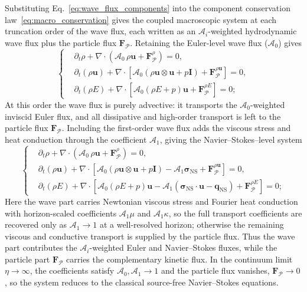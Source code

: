 \documentclass[preprint,12pt]{elsarticle}
\begin{document}
Substituting Eq.~\eqref{eq:wave_flux_components} into the component conservation law~\eqref{eq:macro_conservation} gives the coupled macroscopic system at each truncation order of the wave flux, each written as an $\mathcal A_i$-weighted hydrodynamic wave flux plus the particle flux $\mathbf F_{\mathcal{P}}$. Retaining the Euler-level wave flux ($\mathcal A_0$) gives
\begin{equation}\label{eq:euler_system}
\left\{
\begin{aligned}
&\partial_t\rho
    +\nabla\cdot\left(\mathcal A_0\,\rho\boldsymbol{u}+\mathbf F_{\mathcal{P}}^{\rho}\right)=0,\\
&\partial_t(\rho\boldsymbol{u})
    +\nabla\cdot\left[\mathcal A_0\left(\rho\boldsymbol{u}\otimes\boldsymbol{u}+p\mathbf I\right)
    +\mathbf F_{\mathcal{P}}^{\rho\boldsymbol{u}}\right]=0,\\
&\partial_t(\rho E)
    +\nabla\cdot\left[\mathcal A_0\left(\rho E+p\right)\boldsymbol{u}
    +\mathbf F_{\mathcal{P}}^{\rho E}\right]=0;
\end{aligned}
\right.
\end{equation}
At this order the wave flux is purely advective: it transports the $\mathcal A_0$-weighted inviscid Euler flux, and all dissipative and high-order transport is left to the particle flux $\mathbf F_{\mathcal{P}}$. Including the first-order wave flux adds the viscous stress and heat conduction through the coefficient $\mathcal A_1$, giving the Navier--Stokes--level system
\begin{equation}\label{eq:ns_system}
\left\{
\begin{aligned}
&\partial_t\rho
    +\nabla\cdot\left(\mathcal A_0\,\rho\boldsymbol{u}+\mathbf F_{\mathcal{P}}^{\rho}\right)=0,\\
&\partial_t(\rho\boldsymbol{u})
    +\nabla\cdot\left[\mathcal A_0\left(\rho\boldsymbol{u}\otimes\boldsymbol{u}+p\mathbf I\right)
    -\mathcal A_1\boldsymbol{\sigma}_{\mathrm{NS}}
    +\mathbf F_{\mathcal{P}}^{\rho\boldsymbol{u}}\right]=0,\\
&\partial_t(\rho E)
    +\nabla\cdot\left[\mathcal A_0\left(\rho E+p\right)\boldsymbol{u}
    -\mathcal A_1\left(\boldsymbol{\sigma}_{\mathrm{NS}}\cdot\boldsymbol{u}-\boldsymbol{q}_{\mathrm{NS}}\right)
    +\mathbf F_{\mathcal{P}}^{\rho E}\right]=0;
\end{aligned}
\right.
\end{equation}
Here the wave part carries Newtonian viscous stress and Fourier heat conduction with horizon-scaled coefficients $\mathcal A_1\mu$ and $\mathcal A_1\kappa$, so the full transport coefficients are recovered only as $\mathcal A_1\to1$ at a well-resolved horizon; otherwise the remaining viscous and conductive transport is supplied by the particle flux. Thus the wave part contributes the $\mathcal A_i$-weighted Euler and Navier--Stokes fluxes, while the particle part $\mathbf F_{\mathcal{P}}$ carries the complementary kinetic flux. In the continuum limit $\eta\to\infty$, the coefficients satisfy $\mathcal A_0,\mathcal A_1\to1$ and the particle flux vanishes, $\mathbf F_{\mathcal{P}}\to0$, so the system reduces to the classical source-free Navier--Stokes equations.
\end{document}
